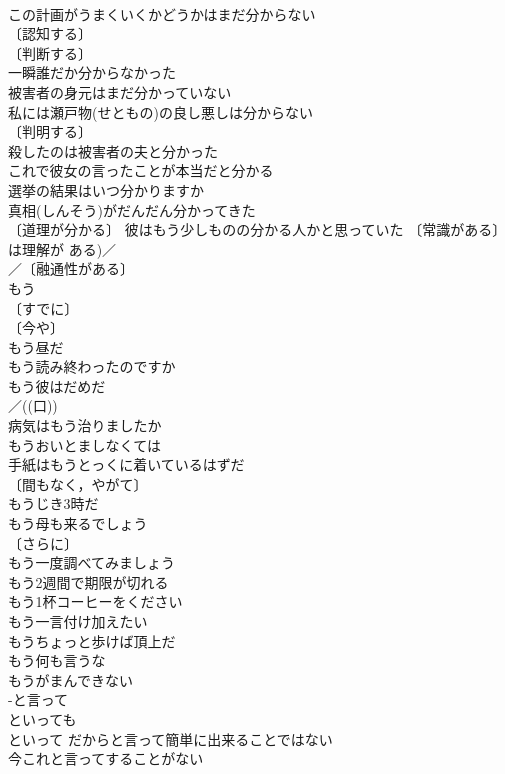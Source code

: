 \documentclass[8pt]{extreport}
\begin{document}
\begin{CJK}{UTF8}{min}
\\	この計画がうまくいくかどうかはまだ分からない 
\\	〔認知する〕
\\	〔判断する〕
\\	一瞬誰だか分からなかった 
\\	被害者の身元はまだ分かっていない 
\\	私には瀬戸物(せともの)の良し悪しは分からない 
\\	〔判明する〕
\\	殺したのは被害者の夫と分かった 
\\	これで彼女の言ったことが本当だと分かる 
\\	選挙の結果はいつ分かりますか 
\\	真相(しんそう)がだんだん分かってきた 
\\	〔道理が分かる〕 彼はもう少しものの分かる人かと思っていた 〔常識がある〕
\\	は理解が ある)／
\\	／〔融通性がある〕
\\	もう	
\\	〔すでに〕
\\	〔今や〕
\\	もう昼だ 
\\	もう読み終わったのですか 
\\	もう彼はだめだ 
\\	／((口)) 
\\	病気はもう治りましたか 
\\	もうおいとましなくては 
\\	手紙はもうとっくに着いているはずだ 
\\	〔間もなく，やがて〕
\\	もうじき3時だ 
\\	もう母も来るでしょう 
\\	〔さらに〕
\\	もう一度調べてみましょう 
\\	もう2週間で期限が切れる 
\\	もう1杯コーヒーをください 
\\	もう一言付け加えたい 
\\	もうちょっと歩けば頂上だ 
\\	もう何も言うな 
\\	もうがまんできない 
\\	-と言って	
\\	といっても 
\\	といって だからと言って簡単に出来ることではない 
\\	今これと言ってすることがない 

\end{CJK}
\end{document}
